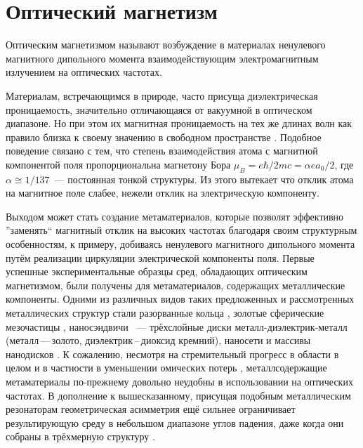 \section{Оптический магнетизм}

Оптическим магнетизмом называют возбуждение в материалах ненулевого магнитного дипольного момента взаимодействующим электромагнитным излучением на оптических частотах.

Материалам, встречающимся в природе, часто присуща диэлектрическая проницаемость, значительно отличающаяся от вакуумной в оптическом диапазоне. Но при этом их магнитная проницаемость на тех же длинах волн как правило близка к своему значению в свободном пространстве \cite{Shalaev2007}. Подобное поведение связано с тем, что степень взаимодействия атома с магнитной компонентой поля пропорциональна магнетону Бора $\mu_B = e \hbar/2 mc = \alpha e a_0 /2$, где $\alpha \cong 1/137$~--- постоянная тонкой структуры. Из этого вытекает что отклик атома на магнитное поле слабее, нежели отклик на электрическую компоненту.

Выходом может стать создание метаматериалов, которые позволят эффективно ''заменять`` магнитный отклик на высоких частотах благодаря своим структурным особенностям, к примеру, добиваясь ненулевого магнитного дипольного момента путём реализации циркуляции электрической компоненты поля. Первые успешные экспериментальные образцы сред, обладающих оптическим магнетизмом, были получены для метаматериалов, содержащих металлические компоненты. Одними из различных видов таких предложенных и рассмотренных металлических структур стали разорванные кольца \cite{Enkrich2005, Klein2006}, золотые сферические мезочастицы \cite{Evlyukhin2012}, наносэндвичи \cite{Pakizeh2006}~--- трёхслойные диски металл-диэлектрик-металл (металл\,---\,золото, диэлектрик\,--\,диоксид кремний), наносети \cite{Reinhold2012} и массивы нанодисков \cite{Gantzounis2008}. К сожалению, несмотря на стремительный прогресс в области в целом и в частности в уменьшении омических потерь \cite{Xiao2010}, металлсодержащие метаматериалы по-прежнему довольно неудобны в использовании на оптических частотах. В дополнение к вышесказанному, присущая подобным металлическим резонаторам геометрическая асимметрия ещё сильнее ограничивает результирующую среду в небольшом диапазоне углов падения, даже когда они собраны в трёхмерную структуру \cite{Burckel2010}.

